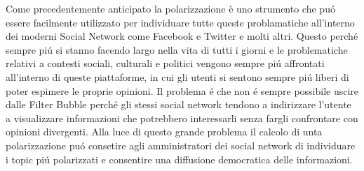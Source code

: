 Come precedentemente anticipato la polarizzazione è uno strumento che pu\'o essere facilmente utilizzato per individuare tutte queste problamatiche all'interno dei moderni Social Network come Facebook e Twitter e molti altri. Questo perch\'e sempre pi\'u si stanno facendo largo nella vita di tutti i giorni e le problematiche relativi a contesti sociali, culturali e politici vengono sempre pi\'u affrontati all'interno di queste piattaforme, in cui gli utenti si sentono sempre pi\'u liberi di poter espimere le proprie opinioni.
Il problema \'e che non \'e sempre possibile uscire dalle Filter Bubble perch\'e gli stessi social network tendono a indirizzare l'utente a visualizzare informazioni che potrebbero interessarli senza fargli confrontare con opinioni divergenti. 
Alla luce di questo grande problema il calcolo di unta polarizzazione pu\'o consetire agli amministratori dei social network di individuare i topic pi\'u polarizzati e consentire una diffusione democratica delle informazioni.

